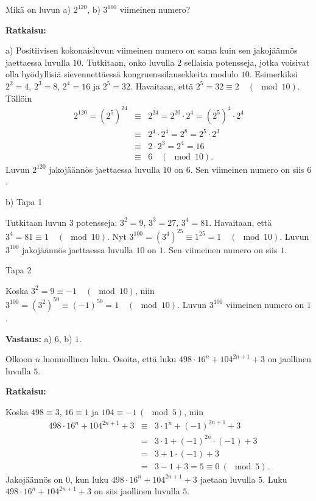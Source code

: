 \begin{esimerkki}
Mikä on luvun a) $2^{120}$, b) $3^{100}$ viimeinen numero?

{\bf Ratkaisu:}

a) Positiivisen kokonaisluvun viimeinen numero on sama kuin sen jakojäännös jaettaessa luvulla $10$.
Tutkitaan, onko luvulla $2$ sellaisia potensseja, jotka voisivat olla hyödyllisiä
sievennettäessä kongruenssilausekkeita modulo $10$. Esimerkiksi $2^2 = 4$, $2^3 = 8$, $2^4 = 16$ ja $2^5 = 32$.
Havaitaan, että $2^5 = 32 \equiv 2 \quad (\mod 10)$. Tällöin
\begin{eqnarray*}
2^{120} = (2^5)^{24} &\equiv& 2^{24} = 2^{20} \cdot 2^4 = (2^5)^4 \cdot 2^4%
\\
&\equiv& 2^4 \cdot 2^4 = 2^8 = 2^5 \cdot 2^3%
\\
&\equiv& 2 \cdot 2^3 = 2^4 = 16%
\\
&\equiv& 6 \quad (\mod 10).
\end{eqnarray*}
Luvun $2^{120}$ jakojäännös
jaettaessa luvulla $10$ on $6$. Sen viimeinen numero on siis $6$.

b) Tapa 1

Tutkitaan luvun $3$ potensseja: $3^2 = 9$, $3^3 = 27$, $3^4 = 81$. Havaitaan, että
$3^4 = 81 \equiv 1 \quad(\mod 10)$. Nyt $3^{100} = (3^4)^{25} \equiv 1^{25}=1 \quad (\mod 10)$. Luvun $3^{100}$ jakojäännös jaettaessa luvulla $10$ on $1$. Sen viimeinen numero on siis $1$.

Tapa 2

Koska $3^2 = 9 \equiv -1 \quad(\mod 10)$, niin $3^{100} = (3^2)^{50} \equiv (-1)^{50} = 1 \quad (\mod 10)$. Luvun $3^{100}$ viimeinen numero on $1$.

{\bf Vastaus:} a) $6$, b) $1$.
\end{esimerkki}

\begin{esimerkki}
Olkoon $n$ luonnollinen luku. Osoita, että luku $498 \cdot 16^{n} + 104^{2n+1} + 3$ on jaollinen luvulla $5$.

{\bf Ratkaisu:}

Koska $498 \equiv 3$, $16 \equiv 1$ ja $104 \equiv -1 \ (\mod 5)$, niin
\begin{eqnarray*}
498 \cdot 16^{n} + 104^{2n+1} + 3 & \equiv & 3 \cdot 1^{n} + (-1)^{2n+1} + 3 \\
 & = & 3 \cdot 1 + (-1)^{2n} \cdot (-1) + 3 \\
 & = & 3 + 1 \cdot (-1) + 3 \\
 & = & 3 - 1 + 3 = 5 \equiv 0 \ (\mod 5).
\end{eqnarray*}
Jakojäännös on $0$, kun luku $498 \cdot 16^{n} + 104^{2n+1} + 3$ jaetaan luvulla $5$. Luku $498 \cdot 16^{n} + 104^{2n+1} + 3$ on siis jaollinen luvulla $5$.
\end{esimerkki}

